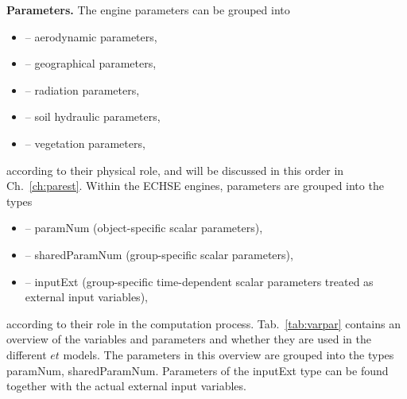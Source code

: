 \documentclass{scrreprt}
\newenvironment{denseitem}{
  \begin{itemize}
    \setlength{\itemsep}{0pt}
    \setlength{\parskip}{0pt}
    \setlength{\parsep}{0pt}
}{
  \end{itemize}
}
\begin{document}
\textbf{Parameters.}
The engine parameters can be grouped into
\begin{denseitem}
  \item[--] aerodynamic parameters,
  \item[--] geographical parameters,
  \item[--] radiation parameters,
  \item[--] soil hydraulic parameters,
  \item[--] vegetation parameters,
\end{denseitem}
%
according to their physical role, and will be discussed in this order in Ch.~\ref{ch:parest}.
Within the ECHSE engines, parameters are grouped into the types
\begin{denseitem}
  \item[--] \textsf{paramNum} (object-specific scalar parameters),
  \item[--] \textsf{sharedParamNum} (group-specific scalar parameters),
  \item[--] \textsf{inputExt} (group-specific time-dependent scalar parameters treated as external input variables),
\end{denseitem}
%
according to their role in the computation process.
Tab.~\ref{tab:varpar} contains an overview of the variables and parameters and whether they are used in the different $et$ models.
The parameters in this overview are grouped into the types \textsf{paramNum}, \textsf{sharedParamNum}.
Parameters of the \textsf{inputExt} type can be found together with the actual external input variables.
\end{document}
